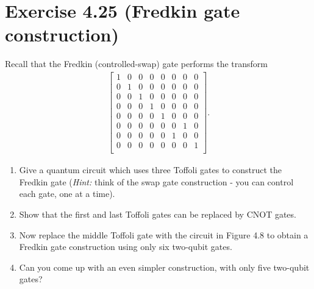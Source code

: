\documentclass{book}
\begin{document}
\section*{Exercise 4.25 (Fredkin gate construction)}
    Recall that the Fredkin (controlled-swap) gate performs the transform
    \begin{align}
    \begin{bmatrix}
        1 & 0 & 0 & 0 & 0 & 0 & 0 & 0 \\
        0 & 1 & 0 & 0 & 0 & 0 & 0 & 0 \\
        0 & 0 & 1 & 0 & 0 & 0 & 0 & 0 \\
        0 & 0 & 0 & 1 & 0 & 0 & 0 & 0 \\
        0 & 0 & 0 & 0 & 1 & 0 & 0 & 0 \\
        0 & 0 & 0 & 0 & 0 & 0 & 1 & 0 \\
        0 & 0 & 0 & 0 & 0 & 1 & 0 & 0 \\
        0 & 0 & 0 & 0 & 0 & 0 & 0 & 1 \\
    \end{bmatrix}.
    \end{align}
    \begin{enumerate}
        \item Give a quantum circuit which uses three Toffoli gates to construct the Fredkin gate (\emph{Hint:} think of the swap gate construction - you can control each gate, one at a time).
        \item Show that the first and last Toffoli gates can be replaced by CNOT gates.
        \item Now replace the middle Toffoli gate with the circuit in Figure 4.8 to obtain a Fredkin gate construction using only six two-qubit gates.
        \item Can you come up with an even simpler construction, with only five two-qubit gates?
    \end{enumerate}
\end{document}
